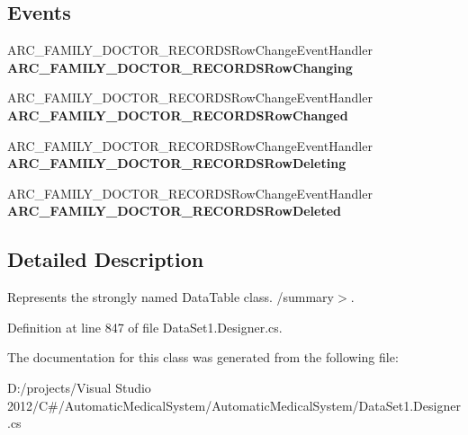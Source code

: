 \subsection*{Events}
\begin{CompactItemize}
\item 
ARC\_\-FAMILY\_\-DOCTOR\_\-RECORDSRowChangeEventHandler \textbf{ARC\_\-FAMILY\_\-DOCTOR\_\-RECORDSRowChanging}\label{class_automatic_medical_system_1_1_data_set1_1_1_a_r_c___f_a_m_i_l_y___d_o_c_t_o_r___r_e_c_o_r_d_s_data_table_63ce6656b0a09572a9f9eb4aa5977363}

\item 
ARC\_\-FAMILY\_\-DOCTOR\_\-RECORDSRowChangeEventHandler \textbf{ARC\_\-FAMILY\_\-DOCTOR\_\-RECORDSRowChanged}\label{class_automatic_medical_system_1_1_data_set1_1_1_a_r_c___f_a_m_i_l_y___d_o_c_t_o_r___r_e_c_o_r_d_s_data_table_ceab249c06186a4fbce19ef95a7ce2ac}

\item 
ARC\_\-FAMILY\_\-DOCTOR\_\-RECORDSRowChangeEventHandler \textbf{ARC\_\-FAMILY\_\-DOCTOR\_\-RECORDSRowDeleting}\label{class_automatic_medical_system_1_1_data_set1_1_1_a_r_c___f_a_m_i_l_y___d_o_c_t_o_r___r_e_c_o_r_d_s_data_table_0222e54808c29c2f9c9f4809aea09af8}

\item 
ARC\_\-FAMILY\_\-DOCTOR\_\-RECORDSRowChangeEventHandler \textbf{ARC\_\-FAMILY\_\-DOCTOR\_\-RECORDSRowDeleted}\label{class_automatic_medical_system_1_1_data_set1_1_1_a_r_c___f_a_m_i_l_y___d_o_c_t_o_r___r_e_c_o_r_d_s_data_table_ebb727fdb3f92e445b891497f94d0390}

\end{CompactItemize}


\subsection{Detailed Description}
Represents the strongly named DataTable class. /summary$>$. 

Definition at line 847 of file DataSet1.Designer.cs.

The documentation for this class was generated from the following file:\begin{CompactItemize}
\item 
D:/projects/Visual Studio 2012/C\#/AutomaticMedicalSystem/AutomaticMedicalSystem/DataSet1.Designer.cs\end{CompactItemize}
